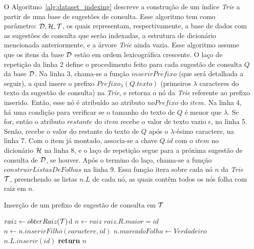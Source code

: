 O Algoritmo~\ref{alg:dataset_indexing} descreve a construção de um índice \textit{Trie} a partir de uma base de sugestões de consulta. Esse algoritmo tem como parâmetro: $\mathcal{D}, \mathcal{H}, \mathcal{T}$, os quais representam, respectivamente, a base de dados com as sugestões de consulta que serão indexadas, a estrutura de dicionário mencionada anteriormente, e a árvore \textit{Trie} ainda vazia. Esse algoritmo assume que os itens da base $\mathcal{D}$ estão em ordem lexicográfica crescente. O laço de repetição da linha 2 define o procedimento feito para cada sugestão de consulta $Q$ da base $\mathcal{D}$. Na linha 3, chama-se a função $inserirPrefixo$ (que será detalhada a seguir), a qual insere o prefixo $Prefixo_{\lambda}(Q.texto)$ (primeiros $\lambda$ caracteres do texto da sugestão de consulta) na \textit{Trie}, e retorna o nó da \textit{Trie} referente ao prefixo inserido. Então, esse nó é atribuído ao atributo $noPrefixo$ do $item$. Na linha 4, há uma condição para verificar se o tamanho do texto de $Q$ é menor que $\lambda$. Se for, então o atributo $restante$ do $item$ recebe o valor de texto vazio $\epsilon$, na linha 5. Senão, recebe o valor do restante do texto de $Q$ após o $\lambda$-ésimo caractere, na linha 7. Com o item já montado, associa-se a chave $Q.id$ com o $item$ no dicionário $\mathcal{H}$ na linha 8, e o laço de repetição segue para a próxima sugestão de consulta de $\mathcal{D}$, se houver. Após o termino do laço, chama-se a função $construirListasDeFolhas$ na linha 9. Essa função itera sobre cada nó $n$ da \textit{Trie}  $\mathcal{T}$, preenchendo as listas $n.L$ de cada nó, as quais contêm todos os nós folha com raiz em $n$.


\begin{algorithm}[H]
\caption{Inserção de um prefixo de sugestão de consulta em $\mathcal{T}$}\label{alg:append_prefix_trie}
\begin{algorithmic}[1]
    \State $raiz \leftarrow obterRaiz(\mathcal{T})$d
    \State $n \leftarrow raiz$
    \State $raiz.R.maior = id$
        \State $n \leftarrow n.inserirFilho(caractere, id)$
    \EndFor
    \State $n.marcadoFolha \leftarrow Verdadeiro$
    \State $n.L.inserir(id)$
    \State \textbf{return} $n$
\EndFunction
\end{algorithmic}
\end{algorithm}

